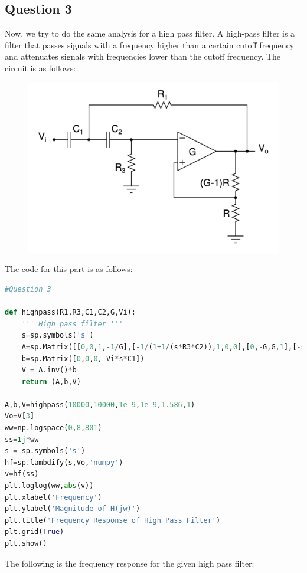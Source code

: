 \documentclass[11pt, a4paper]{article}
\begin{document}
\subsection{Question 3}
Now, we try to do the same analysis for a high pass filter. A high-pass filter is a  filter that passes signals with a frequency higher than a certain cutoff frequency and attenuates signals with frequencies lower than the cutoff frequency. The circuit is as follows:

\begin{figure}[H]
     \centering
     \includegraphics[scale=0.3]{Figure_8.png}
\end{figure}

The code for this part is as follows:\\
\begin{lstlisting}[language = Python]
#Question 3

def highpass(R1,R3,C1,C2,G,Vi):
    ''' High pass filter '''
    s=sp.symbols('s')
    A=sp.Matrix([[0,0,1,-1/G],[-1/(1+1/(s*R3*C2)),1,0,0],[0,-G,G,1],[-s*C1-s*C2-1/R1,s*C2,0,1/R1]])
    b=sp.Matrix([0,0,0,-Vi*s*C1])
    V = A.inv()*b
    return (A,b,V)

A,b,V=highpass(10000,10000,1e-9,1e-9,1.586,1) 
Vo=V[3] 
ww=np.logspace(0,8,801)
ss=1j*ww
s = sp.symbols('s')
hf=sp.lambdify(s,Vo,'numpy')
v=hf(ss)
plt.loglog(ww,abs(v))
plt.xlabel('Frequency')
plt.ylabel('Magnitude of H(jw)')
plt.title('Frequency Response of High Pass Filter')
plt.grid(True)
plt.show()


\end{lstlisting}

The following is the frequency response for the given high pass filter:
\end{document}
